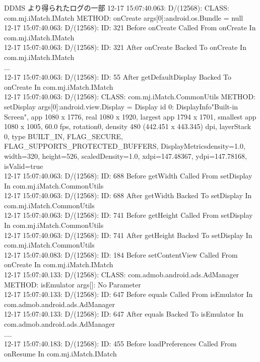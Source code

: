 \begin{itembox}[c]{DDMS より得られたログの一部}
\footnotesize{
12-17 15:07:40.063: D/(12568): CLASS: com.mj.iMatch.IMatch METHOD: onCreate args[0]:android.os.Bundle = null\\
12-17 15:07:40.063: D/(12568): ID: 321 Before onCreate Called From onCreate In com.mj.iMatch.IMatch\\
12-17 15:07:40.063: D/(12568): ID: 321 After onCreate Backed To onCreate In com.mj.iMatch.IMatch\\
...\\
12-17 15:07:40.063: D/(12568): ID: 55 After getDefaultDisplay Backed To  onCreate In com.mj.iMatch.IMatch\\
12-17 15:07:40.063: D/(12568): CLASS: com.mj.iMatch.CommonUtils METHOD: setDisplay args[0]:android.view.Display = Display id 0: DisplayInfo{"Built-in Screen", app 1080 x 1776, real 1080 x 1920, largest app 1794 x 1701, smallest app 1080 x 1005, 60.0 fps, rotation0, density 480 (442.451 x 443.345) dpi, layerStack 0, type BUILT\_IN, FLAG\_SECURE, FLAG\_SUPPORTS\_PROTECTED\_BUFFERS}, DisplayMetrics{density=1.0, width=320, height=526, scaledDensity=1.0, xdpi=147.48367, ydpi=147.78168}, isValid=true\\
12-17 15:07:40.063: D/(12568): ID: 688 Before getWidth Called From setDisplay In com.mj.iMatch.CommonUtils\\
12-17 15:07:40.063: D/(12568): ID: 688 After getWidth Backed To  setDisplay In com.mj.iMatch.CommonUtils\\
12-17 15:07:40.063: D/(12568): ID: 741 Before getHeight Called From setDisplay In com.mj.iMatch.CommonUtils\\
12-17 15:07:40.063: D/(12568): ID: 741 After getHeight Backed To  setDisplay In com.mj.iMatch.CommonUtils\\
12-17 15:07:40.083: D/(12568): ID: 184 Before setContentView Called From onCreate In com.mj.iMatch.IMatch\\
12-17 15:07:40.133: D/(12568): CLASS: com.admob.android.ads.AdManager METHOD: isEmulator args[]: No Parameter\\
12-17 15:07:40.133: D/(12568): ID: 647 Before equals Called From isEmulator In com.admob.android.ads.AdManager\\
12-17 15:07:40.133: D/(12568): ID: 647 After equals Backed To  isEmulator In com.admob.android.ads.AdManager\\
....\\
12-17 15:07:40.183: D/(12568): ID: 455 Before loadPreferences Called From onResume In com.mj.iMatch.IMatch\\
}
\end{itembox}
